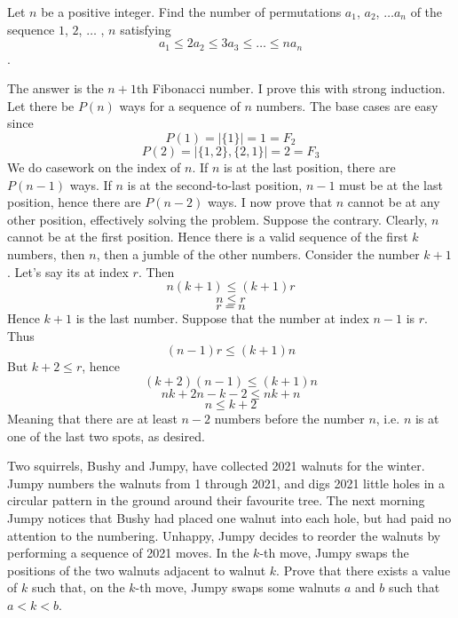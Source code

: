 \documentclass[11pt]{scrartcl}
\begin{document}
\begin{example}
  [2020 ISL]
  Let $n$ be a positive integer. Find the number of permutations $a_1$, $a_2$, $\dots a_n$ of the
  sequence $1$, $2$, $\dots$ , $n$ satisfying
  $$a_1 \le 2a_2\le 3a_3 \le \dots \le na_n$$.
\end{example}
\begin{soln}
  The answer is the $n+1$th Fibonacci number. I prove this with strong induction.
  Let there be $P(n)$ ways for a sequence of $n$ numbers.
  The base cases are easy since
  $$P(1)=|\{1\}|=1=F_2$$
  $$P(2)=|\{1,2\}, \{2,1\}|=2=F_3$$
  We do casework on the index of $n$. If $n$ is at the last position, there are
  $P(n-1)$ ways. If $n$ is at the second-to-last position, $n-1$ must be at the
  last position, hence there are $P(n-2)$ ways. I now prove that $n$ cannot be
  at any other position, effectively solving the problem.
  \newline \newline
  Suppose the contrary. Clearly, $n$ cannot be at the first position.
  Hence there is a valid sequence of the first $k$ numbers, then $n$,
  then a jumble of the other numbers. Consider the number $k+1$.
  Let's say its at index $r$. Then
  $$n(k+1)\le (k+1)r$$
  $$n\le r$$
  $$r=n$$
  Hence $k+1$ is the last number. Suppose that the number at index $n-1$ is
  $r$. Thus
  $$(n-1)r\le(k+1)n$$
  But $k+2\le r$, hence
  $$(k+2)(n-1)\le (k+1)n$$
  $$nk+2n-k-2\le nk+n$$
  $$n\le k+2$$
  Meaning that there are at least $n-2$ numbers before the number $n$,
  i.e. $n$ is at one of the last two spots, as desired.
\end{soln}
\begin{example}
  [IMO 2021 P5]
  Two squirrels, Bushy and Jumpy, have collected 2021 walnuts for the winter. Jumpy numbers the walnuts from 1 through 2021, and digs 2021 little holes in a circular pattern in the ground around their favourite tree. The next morning Jumpy notices that Bushy had placed one walnut into each hole, but had paid no attention to the numbering. Unhappy, Jumpy decides to reorder the walnuts by performing a sequence of 2021 moves. In the $k$-th move, Jumpy swaps the positions of the two walnuts adjacent to walnut $k$. Prove that there exists a value of $k$ such that, on the $k$-th move, Jumpy swaps some walnuts $a$ and $b$ such that $a<k<b$.
\end{example}
\end{document}
